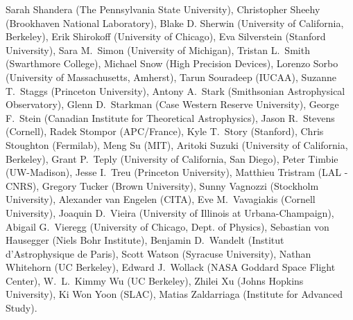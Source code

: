 Sarah Shandera (The Pennsylvania State University),
Christopher Sheehy (Brookhaven National Laboratory),
Blake D. Sherwin (University of California, Berkeley),
Erik Shirokoff (University of Chicago),
Eva Silverstein (Stanford University),
Sara M.~Simon (University of Michigan),
Tristan L.~Smith (Swarthmore College),
Michael Snow (High Precision Devices),
Lorenzo Sorbo (University of Massachusetts, Amherst),
Tarun Souradeep (IUCAA),
Suzanne T.~Staggs (Princeton University),
Antony A.~Stark (Smithsonian Astrophysical Observatory),
Glenn D.~Starkman (Case Western Reserve University),
George F.~Stein (Canadian Institute for Theoretical Astrophysics),
Jason R.~Stevens (Cornell),
Radek Stompor (APC/France),
Kyle T.~Story (Stanford),
Chris Stoughton (Fermilab),
Meng Su (MIT),
Aritoki Suzuki (University of California, Berkeley),
Grant P.~Teply (University of California, San Diego),
Peter Timbie (UW-Madison),
Jesse I.~Treu (Princeton University),
Matthieu Tristram (LAL - CNRS),
Gregory Tucker (Brown University),
Sunny Vagnozzi (Stockholm University),
Alexander van Engelen (CITA),
Eve M.~Vavagiakis (Cornell University),
Joaquin D.~Vieira (University of Illinois at Urbana-Champaign),
Abigail G.~Vieregg (University of Chicago, Dept. of Physics),
Sebastian von Hausegger (Niels Bohr Institute),
Benjamin D.~Wandelt (Institut d'Astrophysique de Paris),
Scott Watson (Syracuse University),
Nathan Whitehorn (UC Berkeley),
Edward J.~Wollack (NASA Goddard Space Flight Center),
W.~L.~Kimmy Wu (UC Berkeley),
Zhilei Xu (Johns Hopkins University),
Ki Won Yoon (SLAC),
Matias Zaldarriaga (Institute for Advanced Study).
